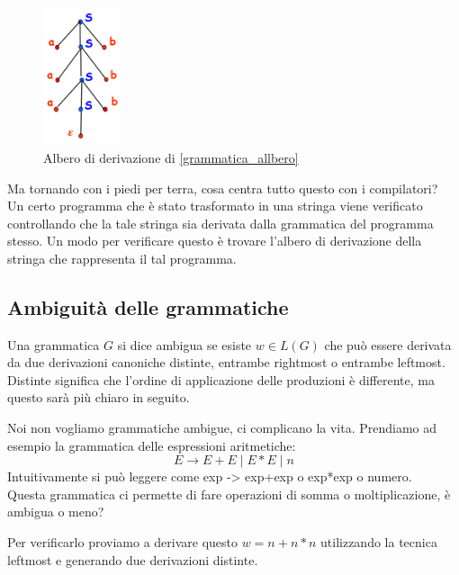 \documentclass[class=book, crop=false, oneside, 12pt]{standalone}
\begin{document}
\begin{figure}[H]
	\centering
	\includegraphics[width=0.2\textwidth,keepaspectratio]{albero_di_derivazione}
    \caption{Albero di derivazione di \ref{grammatica_allbero}}
    \label{albero_di_derivazione}
\end{figure}
Ma tornando con i piedi per terra, cosa centra tutto questo con i compilatori?\\
Un certo programma che è stato trasformato in una stringa viene verificato controllando che la tale stringa sia derivata dalla grammatica del programma stesso. Un modo per verificare questo è trovare l’albero di derivazione della stringa che rappresenta il tal programma.

\subsection{Ambiguità delle grammatiche}
Una grammatica $G$ si dice ambigua se esiste $w \in L(G)$ che può essere derivata da due derivazioni canoniche distinte, entrambe rightmost o entrambe leftmost. Distinte significa che l'ordine di applicazione delle produzioni è differente, ma questo sarà più chiaro in seguito.

Noi non vogliamo grammatiche ambigue, ci complicano la vita.
Prendiamo ad esempio la grammatica delle espressioni aritmetiche:
\begin{equation}
    E \to E+E \mid E*E \mid  n
\end{equation}
Intuitivamente si può leggere come exp -> exp+exp  o  exp*exp  o  numero.\\
Questa grammatica ci permette di fare operazioni di somma o moltiplicazione, è ambigua o meno?

Per verificarlo proviamo a derivare questo $w = n+n*n$ utilizzando la tecnica leftmost e generando due derivazioni distinte.
\end{document}
